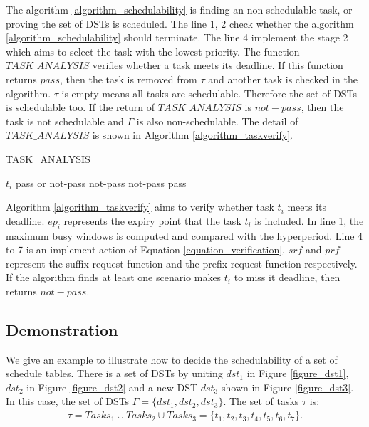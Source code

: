 \documentclass[10pt,conference]{IEEEtran}
\begin{document}
The algorithm \ref{algorithm_schedulability} is finding an non-schedulable task, or proving the set of DSTs is scheduled. The line 1, 2 check whether the algorithm \ref{algorithm_schedulability} should terminate. The line 4 implement the stage 2 which aims to select the task with the lowest priority. The function $TASK\_ANALYSIS$ verifies whether a task meets its deadline. If this function returns $pass$, then the task is removed from $\tau$ and another task is checked in the algorithm. $\tau$ is empty means all tasks are schedulable. Therefore the set of DSTs is schedulable too. If the return of $TASK\_ANALYSIS$ is $not-pass$, then the task is not schedulable and $\Gamma$ is also non-schedulable. The detail of $TASK\_ANALYSIS$ is shown in Algorithm \ref{algorithm_taskverify}.
{

\begin{algorithm}
  \caption{TASK\_ANALYSIS}
  \label{algorithm_taskverify}
  \begin{algorithmic}[1]
    \REQUIRE $t_i$
    \ENSURE pass or not-pass
    \STATE \Return not-pass
    \ENDIF
    \STATE \Return not-pass
    \ENDIF
    \ENDFOR
    \ENDFOR
    \STATE \Return pass
    
  \end{algorithmic}
\end{algorithm}

Algorithm \ref{algorithm_taskverify} aims to verify whether task $t_i$ meets its deadline. $ep_i$ represents the expiry point that the task $t_i$ is included. In line 1, the maximum busy windows is computed and compared with the hyperperiod. Line 4 to 7 is an implement action of Equation \ref{equation_verification}. $srf$ and $prf$ represent the suffix request function and the prefix request function respectively. If the algorithm finds at least one scenario makes $t_i$ to miss it deadline, then returns $not-pass$.

\subsection{Demonstration}\label{section_demonstration}
We give an example to illustrate how to decide the schedulability of a set of schedule tables. There is a set of DSTs by uniting $dst_1$ in Figure \ref{figure_dst1}, $dst_2$ in Figure \ref{figure_dst2} and a new DST $dst_3$ shown in Figure \ref{figure_dst3}. In this case, the set of DSTs $\Gamma =\{dst_1,dst_2,dst_3\}$. The set of tasks $\tau$ is:
\[\begin{split}
\tau=Tasks_1\cup Tasks_2\cup Tasks_3=
\{t_1,t_2,t_3,t_4,t_5,t_6,t_7\}.
\end{split}\]

}
\end{document}

